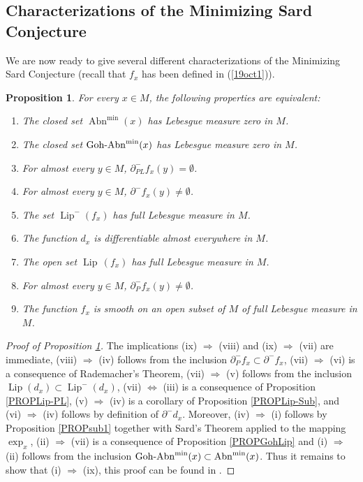 \documentclass[JEP,XML,SOM,Unicode,NoFloatCountersInSection,published]{cedram}
\newenvironment{enumeratei}
{\bgroup\def\theenumi{\roman{enumi}}\def\theenumii{\arabic{enumii}}\begin{enumerate}}
{\end{enumerate}\egroup}
\DeclareMathOperator{\Abn}{Abn}
\DeclareMathOperator{\GohAbn}{Goh\textup{-}Abn}
\DeclareMathOperator{\Lip}{Lip}
\newtheorem{proposition}[theorem]{Proposition}
\theoremstyle{definition}
\begin{document}
\subsection{Characterizations of the Minimizing Sard Conjecture}

We are now ready to give several different characterizations of the Minimizing Sard Conjecture (recall that $f_x$ has been defined in (\ref{19oct1})).

\begin{proposition}\label{PROPcharac}
For every $x\in M$, the following properties are equivalent:
\begin{enumeratei}
\item
The closed set $\Abn^{\min}(x)$ has Lebesgue measure zero in $M$.
\item
The closed set $\GohAbn^{\min}(x)$ has Lebesgue measure zero in $M$.
\item
For almost every $y\in M$, $\partial^-_{PL}f_x(y)= \emptyset$.
\item
For almost every $y\in M$, $\partial^-f_x(y)\neq \emptyset$.
\item
The set $\Lip^-(f_x)$ has full Lebesgue measure in $M$.
\item
The function $d_x$ is differentiable almost everywhere in $M$.
\item
The open set $\Lip\,(f_x)$ has full Lebesgue measure in $M$.
\item
For almost every $y\in M$, $\partial^-_Pf_x(y)\neq \emptyset$.
\item
The function $f_x$ is smooth on an open subset of $M$ of full Lebesgue measure in $M$.
\end{enumeratei}
\end{proposition}

\begin{proof}[Proof of Proposition \ref{PROPcharac}]
The implications (ix) $\Rightarrow$ (viii) and (ix) $\Rightarrow$ (vii) are immediate, (viii) $\Rightarrow$ (iv) follows from the inclusion $\partial^-_Pf_x\subset \partial^-f_x$, (vii) $\Rightarrow$ (vi) is a consequence of Rademacher's Theorem, (vii) $\Rightarrow$ (v) follows from the inclusion $\Lip(d_x) \subset \Lip^-(d_x)$, (vii) $\Leftrightarrow$ (iii) is a consequence of Proposition \ref{PROPLip-PL}, (v) $\Rightarrow$ (iv) is a corollary of Proposition \ref{PROPLip-Sub}, and (vi) $\Rightarrow$ (iv) follows by definition of $\partial^-d_x$. Moreover, (iv) $\Rightarrow$ (i) follows by Proposition \ref{PROPsub1} together with Sard's Theorem applied to the mapping $\exp_x$, (ii) $\Rightarrow$ (vii) is a consequence of Proposition \ref{PROPGohLip} and (i) $\Rightarrow$ (ii) follows from the inclusion $\GohAbn^{\min}(x) \subset \Abn^{\min}(x)$. Thus it remains to show that (i) $\Rightarrow$ (ix), this proof can be found in \cite[\S 2.1]{br20}.
\end{proof}
\end{document}
